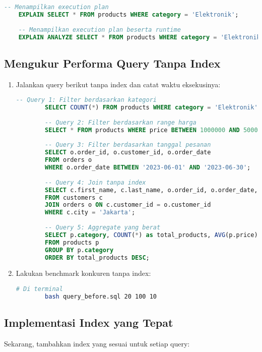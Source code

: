 \begin{lstlisting}[language=SQL]
	-- Menampilkan execution plan
	EXPLAIN SELECT * FROM products WHERE category = 'Elektronik';
	
	-- Menampilkan execution plan beserta runtime
	EXPLAIN ANALYZE SELECT * FROM products WHERE category = 'Elektronik';
\end{lstlisting}

\subsection{Mengukur Performa Query Tanpa Index}
\begin{enumerate}
	\item Jalankan query berikut tanpa index dan catat waktu eksekusinya:
	
	\begin{lstlisting}[language=SQL]
		-- Query 1: Filter berdasarkan kategori
		SELECT COUNT(*) FROM products WHERE category = 'Elektronik';
		
		-- Query 2: Filter berdasarkan range harga
		SELECT * FROM products WHERE price BETWEEN 1000000 AND 5000000;
		
		-- Query 3: Filter berdasarkan tanggal pesanan
		SELECT o.order_id, o.customer_id, o.order_date 
		FROM orders o 
		WHERE o.order_date BETWEEN '2023-06-01' AND '2023-06-30';
		
		-- Query 4: Join tanpa index
		SELECT c.first_name, c.last_name, o.order_id, o.order_date, o.total_amount
		FROM customers c 
		JOIN orders o ON c.customer_id = o.customer_id 
		WHERE c.city = 'Jakarta';
		
		-- Query 5: Aggregate yang berat
		SELECT p.category, COUNT(*) as total_products, AVG(p.price) as avg_price
		FROM products p
		GROUP BY p.category
		ORDER BY total_products DESC;
	\end{lstlisting}
	
	\item Lakukan benchmark konkuren tanpa index:
	
	\begin{lstlisting}[language=bash]
		# Di terminal
		bash query_before.sql 20 100 10
	\end{lstlisting}
\end{enumerate}

\subsection{Implementasi Index yang Tepat}
Sekarang, tambahkan index yang sesuai untuk setiap query:

